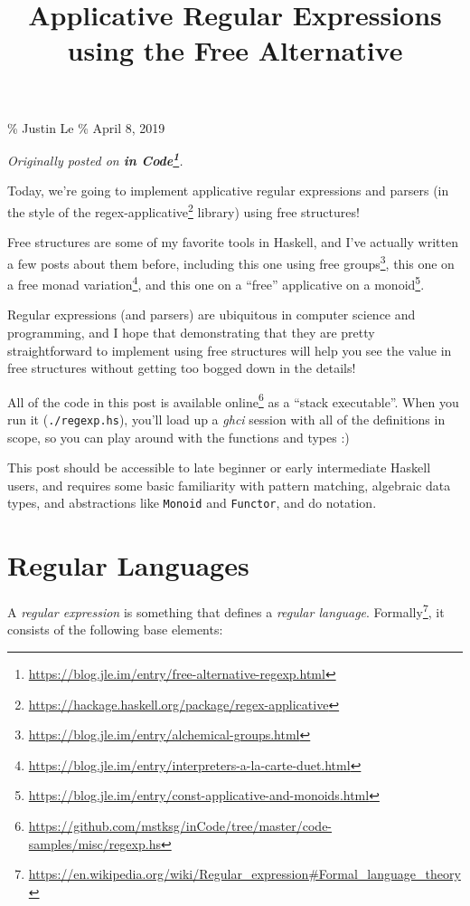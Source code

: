 \documentclass[]{article}
\title{Applicative Regular Expressions using the Free Alternative}
\renewcommand{\href}[2]{#2\footnote{\url{#1}}}
\begin{document}
\maketitle

\% Justin Le \% April 8, 2019

\emph{Originally posted on
\textbf{\href{https://blog.jle.im/entry/free-alternative-regexp.html}{in
Code}}.}

Today, we're going to implement applicative regular expressions and parsers (in
the style of the
\href{https://hackage.haskell.org/package/regex-applicative}{regex-applicative}
library) using free structures!

Free structures are some of my favorite tools in Haskell, and I've actually
written a few posts about them before, including
\href{https://blog.jle.im/entry/alchemical-groups.html}{this one using free
groups}, \href{https://blog.jle.im/entry/interpreters-a-la-carte-duet.html}{this
one on a free monad variation}, and
\href{https://blog.jle.im/entry/const-applicative-and-monoids.html}{this one on
a ``free'' applicative on a monoid}.

Regular expressions (and parsers) are ubiquitous in computer science and
programming, and I hope that demonstrating that they are pretty straightforward
to implement using free structures will help you see the value in free
structures without getting too bogged down in the details!

All of the code in this post is
\href{https://github.com/mstksg/inCode/tree/master/code-samples/misc/regexp.hs}{available
online} as a ``stack executable''. When you run it (\texttt{./regexp.hs}),
you'll load up a \emph{ghci} session with all of the definitions in scope, so
you can play around with the functions and types :)

This post should be accessible to late beginner or early intermediate Haskell
users, and requires some basic familiarity with pattern matching, algebraic data
types, and abstractions like \texttt{Monoid} and \texttt{Functor}, and do
notation.

\section{Regular Languages}\label{regular-languages}

A \emph{regular expression} is something that defines a \emph{regular language}.
\href{https://en.wikipedia.org/wiki/Regular_expression\#Formal_language_theory}{Formally},
it consists of the following base elements:
\end{document}
